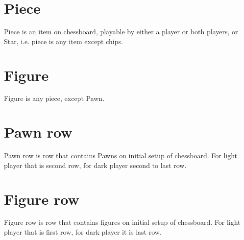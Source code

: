 \section*{Piece}
\label{sec:Terms/Piece}
Piece is an item on chessboard, playable by either a player or both players,
or Star, i.e. piece is any item except chips.

\section*{Figure}
\label{sec:Terms/Figure}
Figure is any piece, except Pawn.

\section*{Pawn row}
\label{sec:Terms/Pawn row}
Pawn row is row that contains Pawns on initial setup of chessboard.
For light player that is second row, for dark player second to last row.

\section*{Figure row}
\label{sec:Terms/Figure row}
Figure row is row that contains figures on initial setup of chessboard.
For light player that is first row, for dark player it is last row.

\clearpage %
